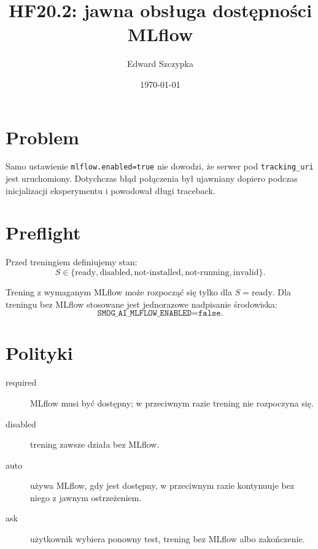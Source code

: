 \documentclass[11pt,a4paper]{article}
\title{HF20.2: jawna obsługa dostępności MLflow}
\author{Edward Szczypka}
\date{\today}
\begin{document}
\maketitle

\section{Problem}

Samo ustawienie \texttt{mlflow.enabled=true} nie dowodzi, że serwer pod
\texttt{tracking\_uri} jest uruchomiony. Dotychczas błąd połączenia był
ujawniany dopiero podczas inicjalizacji eksperymentu i powodował długi
traceback.

\section{Preflight}

Przed treningiem definiujemy stan:
\[
S\in\{
\text{ready},
\text{disabled},
\text{not-installed},
\text{not-running},
\text{invalid}
\}.
\]

Trening z wymaganym MLflow może rozpocząć się tylko dla
\(S=\text{ready}\). Dla treningu bez MLflow stosowane jest jednorazowe
nadpisanie środowiska:
\[
\texttt{SMOG\_AI\_MLFLOW\_ENABLED=false}.
\]

\section{Polityki}

\begin{description}
\item[required] MLflow musi być dostępny; w przeciwnym razie trening nie
rozpoczyna się.
\item[disabled] trening zawsze działa bez MLflow.
\item[auto] używa MLflow, gdy jest dostępny, w przeciwnym razie kontynuuje
bez niego z jawnym ostrzeżeniem.
\item[ask] użytkownik wybiera ponowny test, trening bez MLflow albo
zakończenie.
\end{description}
\end{document}
